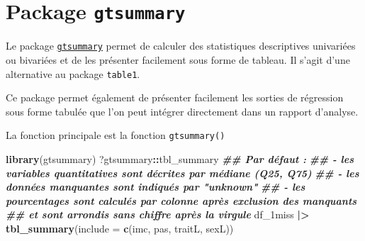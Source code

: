 \documentclass[
]{book}
\newenvironment{Shaded}{\begin{snugshade}}{\end{snugshade}}
\newcommand{\AttributeTok}[1]{\textcolor[rgb]{0.13,0.29,0.53}{#1}}
\newcommand{\DocumentationTok}[1]{\textcolor[rgb]{0.56,0.35,0.01}{\textbf{\textit{#1}}}}
\newcommand{\FunctionTok}[1]{\textcolor[rgb]{0.13,0.29,0.53}{\textbf{#1}}}
\newcommand{\NormalTok}[1]{#1}
\newcommand{\SpecialCharTok}[1]{\textcolor[rgb]{0.81,0.36,0.00}{\textbf{#1}}}
\begin{document}
\section{\texorpdfstring{Package \texttt{gtsummary}}{Package gtsummary}}\label{package-gtsummary}

Le package \href{https://www.danieldsjoberg.com/gtsummary/index.html}{\texttt{gtsummary}} permet de calculer des statistiques descriptives univariées ou bivariées et de les présenter facilement sous forme de tableau. Il s'agit d'une alternative au package \texttt{table1}.

Ce package permet également de présenter facilement les sorties de régression sous forme tabulée que l'on peut intégrer directement dans un rapport d'analyse.

La fonction principale est la fonction \texttt{gtsummary()}

\begin{Shaded}
\begin{Highlighting}[]
\FunctionTok{library}\NormalTok{(gtsummary)}
\NormalTok{?gtsummary}\SpecialCharTok{::}\NormalTok{tbl\_summary}
\DocumentationTok{\#\# Par défaut : }
\DocumentationTok{\#\# {-} les variables quantitatives sont décrites par médiane (Q25, Q75)}
\DocumentationTok{\#\# {-} les données manquantes sont indiqués par "unknown"}
\DocumentationTok{\#\# {-} les pourcentages sont calculés par colonne après exclusion des manquants }
\DocumentationTok{\#\#   et sont arrondis sans chiffre après la virgule}
\NormalTok{df\_1miss }\SpecialCharTok{|\textgreater{}} 
  \FunctionTok{tbl\_summary}\NormalTok{(}\AttributeTok{include =} \FunctionTok{c}\NormalTok{(imc, pas, traitL, sexL))}
\end{Highlighting}
\end{Shaded}
\end{document}
